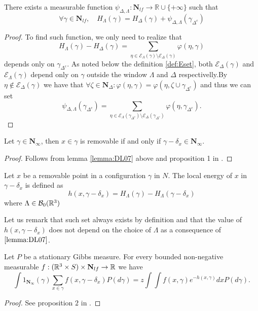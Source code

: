 \begin{lemma}\label{lemma:DL07}
	There exists a measurable function $\psi_{\Delta,\Lambda}:\mathbf N_{lf}\to \mathbb R\cup\{+\infty\}$ such that
	$$\forall \gamma \in \mathbf N_{lf},\quad H_\Lambda(\gamma) = H_\Delta(\gamma) + \psi_{\Delta,\Lambda}(\gamma_{\Delta^c})$$
\end{lemma}
\begin{proof}
	To find such function, we only need to realize that
	$$H_\Lambda(\gamma) - H_\Delta(\gamma) = \sum_{\eta \in \mathcal E_\Lambda(\gamma) \setminus \mathcal E_\Delta(\gamma)} \varphi(\eta,\gamma)$$
	depends only on $\gamma_{\Delta^c}$. As noted below the definition \ref{def:Eset}, both $\mathcal E_\Delta(\gamma)$ and $\mathcal E_\Lambda(\gamma)$ depend only on $\gamma$ outside the window $\Lambda$ and $\Delta$ respectivelly.By $\eta \notin \mathcal E_{\Delta}(\gamma)$ we have that $\forall \zeta \in \mathbf N_\Delta: \varphi(\eta,\gamma)=\varphi(\eta,\zeta \cup \gamma_{\Delta^c})$ and thus we can set
	$$\psi_{\Delta,\Lambda}(\gamma_{\Delta^c}) = \sum_{\eta \in \mathcal E_\Lambda(\gamma_{\Delta^c}) \setminus \mathcal E_\Delta(\gamma_{\Delta^c})} \varphi(\eta,\gamma_{\Delta^c}).$$
\end{proof}



\begin{proposition}
	Let $\gamma \in \mathbf N_\infty$, then $x\in\gamma$ is removable if and only if $\gamma - \delta_x \in \mathbf N_\infty$.
\end{proposition}
\begin{proof}
	Follows from lemma \ref{lemma:DL07} above and proposition 1 in \cite{DereudreLavancier2007}.	
\end{proof}


\begin{definition}
	Let $x$ be a removable point in a configuration $\gamma$ in $N$. The local energy of $x$ in $\gamma - \delta_x$ is defined as
	$$h(x,\gamma - \delta_x) = H_\Lambda (\gamma) - H_\Lambda(\gamma - \delta_x)$$
	where $\Lambda \in \mathcal B_0({\mathbb R^3})$
\end{definition}
Let us remark that such set always exists by definition and that the value of $h(x,\gamma-\delta_x)$ does not depend on the choice of $\Lambda$ as a consequence of $\ref{lemma:DL07}$.


\begin{proposition}
	Let $P$ be a stationary Gibbs measure. For every bounded non-negative measurable $f:({\mathbb R^3}\times S) \times \mathbf N_{lf}\to\mathbb R$ we have
	$$\int 1_{\mathbf N_\infty}(\gamma) \sum_{x \in \gamma} f(x,\gamma -\delta_x) P(d\gamma) = z \int \int f(x,\gamma)e^{-h(x,\gamma)} dx P(d\gamma).$$
\end{proposition}
\begin{proof}
	See proposition $2$ in \cite{DereudreLavancier2007}.
\end{proof}

